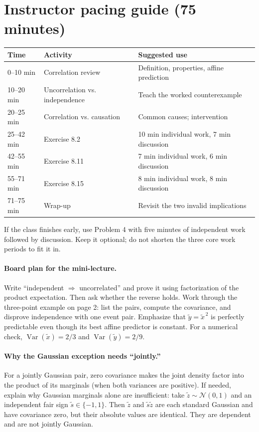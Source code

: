 \documentclass[11pt]{article}
\newcommand{\Var}{\operatorname{Var}}
\newcommand{\rv}[1]{\widetilde{#1}}
\begin{document}
\section*{Instructor pacing guide (75 minutes)}
\begin{center}
\begin{tabular}{@{}lll@{}}
\toprule
Time & Activity & Suggested use\\
\midrule
0--10 min & Correlation review & Definition, properties, affine prediction\\
10--20 min & Uncorrelation vs. independence & Teach the worked counterexample\\
20--25 min & Correlation vs. causation & Common causes; intervention\\
25--42 min & Exercise 8.2 & 10 min individual work, 7 min discussion\\
42--55 min & Exercise 8.11 & 7 min individual work, 6 min discussion\\
55--71 min & Exercise 8.15 & 8 min individual work, 8 min discussion\\
71--75 min & Wrap-up & Revisit the two invalid implications\\
\bottomrule
\end{tabular}
\end{center}
If the class finishes early, use Problem 4 with five minutes of independent
work followed by discussion. Keep it optional; do not shorten the three
core work periods to fit it in.

\paragraph{Board plan for the mini-lecture.}
Write ``independent $\Rightarrow$ uncorrelated'' and prove it using
factorization of the product expectation. Then ask whether the reverse
holds. Work through the three-point example on page 2: list the pairs,
compute the covariance, and disprove independence with one event pair.
Emphasize that $\rv{y}=\rv{x}^{\,2}$ is perfectly predictable even though
its best affine predictor is constant. For a numerical check,
$\Var(\rv{x})=2/3$ and $\Var(\rv{y})=2/9$.

\paragraph{Why the Gaussian exception needs ``jointly.''}
For a jointly Gaussian pair, zero covariance makes the joint density
factor into the product of its marginals (when both variances are positive).
If needed, explain why Gaussian marginals alone are insufficient: take
$\rv{z}\sim\mathcal N(0,1)$ and an independent fair sign
$\rv{s}\in\{-1,1\}$. Then $\rv{z}$ and $\rv{s}\rv{z}$ are each standard
Gaussian and have covariance zero, but their absolute values are identical.
They are dependent and are not jointly Gaussian.
\end{document}
